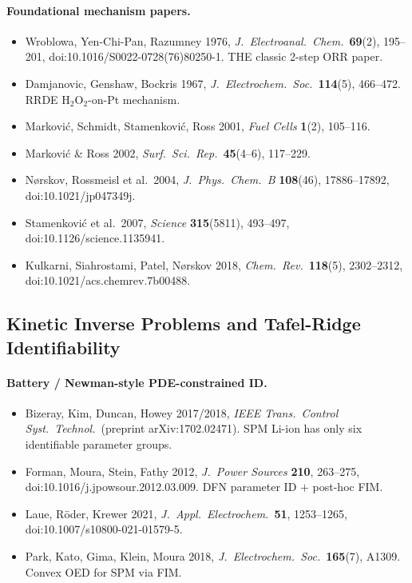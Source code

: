 \documentclass[11pt]{article}
\newcommand{\HtwoOtwo}{\mathrm{H}_2\mathrm{O}_2}
\begin{document}
\paragraph{Foundational mechanism papers.}
\begin{itemize}
\item Wroblowa, Yen-Chi-Pan, Razumney 1976,
      \emph{J.~Electroanal.~Chem.}\ \textbf{69}(2), 195--201,
      doi:10.1016/S0022-0728(76)80250-1. THE classic 2-step ORR paper.
\item Damjanovic, Genshaw, Bockris 1967,
      \emph{J.~Electrochem.~Soc.}\ \textbf{114}(5), 466--472. RRDE
      $\HtwoOtwo$-on-Pt mechanism.
\item Markovi\'c, Schmidt, Stamenkovi\'c, Ross 2001, \emph{Fuel Cells}
      \textbf{1}(2), 105--116.
\item Markovi\'c \& Ross 2002, \emph{Surf.~Sci.~Rep.}\ \textbf{45}(4--6),
      117--229.
\item N{\o}rskov, Rossmeisl et al.\ 2004, \emph{J.~Phys.~Chem.~B}
      \textbf{108}(46), 17886--17892, doi:10.1021/jp047349j.
\item Stamenkovi\'c et al.\ 2007, \emph{Science} \textbf{315}(5811), 493--497,
      doi:10.1126/science.1135941.
\item Kulkarni, Siahrostami, Patel, N{\o}rskov 2018, \emph{Chem.~Rev.}\
      \textbf{118}(5), 2302--2312, doi:10.1021/acs.chemrev.7b00488.
\end{itemize}

\subsection{Kinetic Inverse Problems and Tafel-Ridge Identifiability}

\paragraph{Battery / Newman-style PDE-constrained ID.}
\begin{itemize}
\item Bizeray, Kim, Duncan, Howey 2017/2018,
      \emph{IEEE Trans.~Control Syst.~Technol.}\ (preprint
      arXiv:1702.02471). SPM Li-ion has only six identifiable parameter
      groups.
\item Forman, Moura, Stein, Fathy 2012, \emph{J.~Power Sources} \textbf{210},
      263--275, doi:10.1016/j.jpowsour.2012.03.009. DFN parameter ID $+$
      post-hoc FIM.
\item Laue, R\"oder, Krewer 2021, \emph{J.~Appl.~Electrochem.}\ \textbf{51},
      1253--1265, doi:10.1007/s10800-021-01579-5.
\item Park, Kato, Gima, Klein, Moura 2018, \emph{J.~Electrochem.~Soc.}\
      \textbf{165}(7), A1309. Convex OED for SPM via FIM.
\end{itemize}
\end{document}
